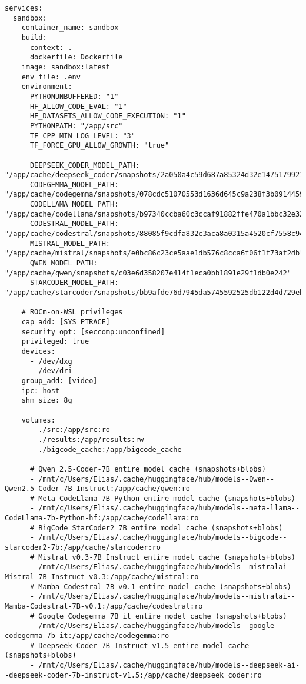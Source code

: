 \begin{verbatim}
services:
  sandbox:
    container_name: sandbox
    build:
      context: .
      dockerfile: Dockerfile  
    image: sandbox:latest
    env_file: .env
    environment:
      PYTHONUNBUFFERED: "1"
      HF_ALLOW_CODE_EVAL: "1"
      HF_DATASETS_ALLOW_CODE_EXECUTION: "1"
      PYTHONPATH: "/app/src"
      TF_CPP_MIN_LOG_LEVEL: "3"
      TF_FORCE_GPU_ALLOW_GROWTH: "true"
        
      DEEPSEEK_CODER_MODEL_PATH:          "/app/cache/deepseek_coder/snapshots/2a050a4c59d687a85324d32e147517992117ed30"
      CODEGEMMA_MODEL_PATH:               "/app/cache/codegemma/snapshots/078cdc51070553d1636d645c9a238f3b0914459a"
      CODELLAMA_MODEL_PATH:               "/app/cache/codellama/snapshots/b97340ccba60c3ccaf91882ffe470a1bbc32e32c"
      CODESTRAL_MODEL_PATH:               "/app/cache/codestral/snapshots/88085f9cdfa832c3aca8a0315a4520cf7558c947"
      MISTRAL_MODEL_PATH:                 "/app/cache/mistral/snapshots/e0bc86c23ce5aae1db576c8cca6f06f1f73af2db"
      QWEN_MODEL_PATH:                    "/app/cache/qwen/snapshots/c03e6d358207e414f1eca0bb1891e29f1db0e242"
      STARCODER_MODEL_PATH:               "/app/cache/starcoder/snapshots/bb9afde76d7945da5745592525db122d4d729eb1"

    # ROCm-on-WSL privileges
    cap_add: [SYS_PTRACE]
    security_opt: [seccomp:unconfined]
    privileged: true
    devices:
      - /dev/dxg
      - /dev/dri
    group_add: [video]
    ipc: host
    shm_size: 8g

    volumes:
      - ./src:/app/src:ro
      - ./results:/app/results:rw
      - ./bigcode_cache:/app/bigcode_cache

      # Qwen 2.5-Coder-7B entire model cache (snapshots+blobs)
      - /mnt/c/Users/Elias/.cache/huggingface/hub/models--Qwen--Qwen2.5-Coder-7B-Instruct:/app/cache/qwen:ro
      # Meta CodeLlama 7B Python entire model cache (snapshots+blobs)
      - /mnt/c/Users/Elias/.cache/huggingface/hub/models--meta-llama--CodeLlama-7b-Python-hf:/app/cache/codellama:ro
      # BigCode StarCoder2 7B entire model cache (snapshots+blobs)
      - /mnt/c/Users/Elias/.cache/huggingface/hub/models--bigcode--starcoder2-7b:/app/cache/starcoder:ro
      # Mistral v0.3-7B Instruct entire model cache (snapshots+blobs) 
      - /mnt/c/Users/Elias/.cache/huggingface/hub/models--mistralai--Mistral-7B-Instruct-v0.3:/app/cache/mistral:ro
      # Mamba-Codestral-7B-v0.1 entire model cache (snapshots+blobs) 
      - /mnt/c/Users/Elias/.cache/huggingface/hub/models--mistralai--Mamba-Codestral-7B-v0.1:/app/cache/codestral:ro
      # Google Codegemma 7B it entire model cache (snapshots+blobs) 
      - /mnt/c/Users/Elias/.cache/huggingface/hub/models--google--codegemma-7b-it:/app/cache/codegemma:ro
      # Deepseek Coder 7B Instruct v1.5 entire model cache (snapshots+blobs) 
      - /mnt/c/Users/Elias/.cache/huggingface/hub/models--deepseek-ai--deepseek-coder-7b-instruct-v1.5:/app/cache/deepseek_coder:ro


\end{verbatim}
